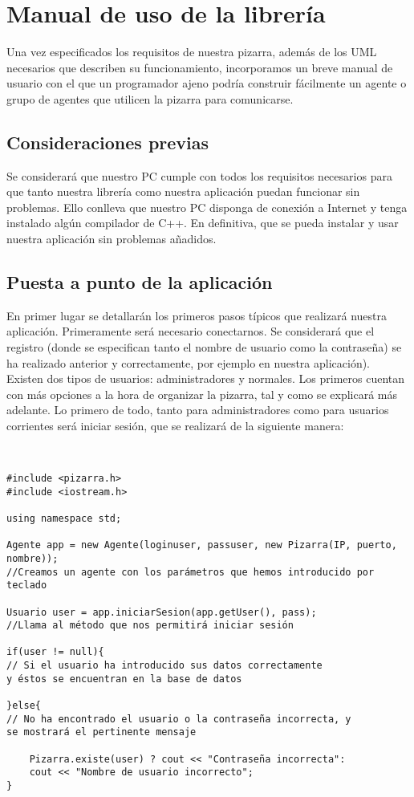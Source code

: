\chapter{Manual de uso de la librería}
\lettrine[lines=1,slope=4pt,findent=0pt]{U}{}na vez especificados los requisitos de nuestra pizarra, además de los UML necesarios que describen su funcionamiento, incorporamos un breve manual de usuario con el que un programador ajeno podría construir fácilmente un agente o grupo de agentes que utilicen la pizarra para comunicarse.
\section{Consideraciones previas}
Se considerará que nuestro PC cumple con todos los requisitos necesarios para que tanto nuestra librería como nuestra aplicación puedan funcionar sin problemas. Ello conlleva que nuestro PC disponga de conexión a Internet y tenga instalado algún compilador de C++. En definitiva, que se pueda instalar y usar nuestra aplicación sin problemas añadidos.

\section{Puesta a punto de la aplicación} \label{sec:puesta}
En primer lugar se detallarán los primeros pasos típicos que realizará nuestra aplicación. Primeramente será necesario conectarnos. Se considerará que el registro (donde se especifican tanto el nombre de usuario como la contraseña) se ha realizado anterior y correctamente, por ejemplo en nuestra aplicación).\\

Existen dos tipos de usuarios: administradores y normales. Los primeros cuentan con más opciones a la hora de organizar la pizarra, tal y como se explicará más adelante. Lo primero de todo, tanto para administradores como para usuarios corrientes será iniciar sesión, que se realizará de la siguiente manera:
\begin{verbatim}


#include <pizarra.h>
#include <iostream.h>

using namespace std;

Agente app = new Agente(loginuser, passuser, new Pizarra(IP, puerto, nombre)); 
//Creamos un agente con los parámetros que hemos introducido por teclado

Usuario user = app.iniciarSesion(app.getUser(), pass); 
//Llama al método que nos permitirá iniciar sesión

if(user != null){ 
// Si el usuario ha introducido sus datos correctamente 
y éstos se encuentran en la base de datos

}else{            
// No ha encontrado el usuario o la contraseña incorrecta, y 
se mostrará el pertinente mensaje 

    Pizarra.existe(user) ? cout << "Contraseña incorrecta":
    cout << "Nombre de usuario incorrecto";
}
\end{verbatim}

